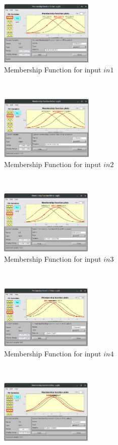 \documentclass[11pt]{article}
\begin{document}
\begin{figure}[ht]
	\centering
	\begin{subfigure}[t]{0.3\textwidth}
		\centering
		\includegraphics[height=1.2in]{images/subtractive_in1}
		\caption{Membership Function for input $in1$}
	\end{subfigure}
	~ 
	\begin{subfigure}[t]{0.3\textwidth}
		\centering
		\includegraphics[height=1.2in]{images/subtractive_in2}
		\caption{Membership Function for input $in2$}
	\end{subfigure}
	~
	\begin{subfigure}[t]{0.3\textwidth}
		\centering
		\includegraphics[height=1.2in]{images/subtractive_in3}
		\caption{Membership Function for input $in3$}
	\end{subfigure}
	\\
	\begin{subfigure}[t]{0.3\textwidth}
		\centering
		\includegraphics[height=1.2in]{images/subtractive_in4}
		\caption{Membership Function for input $in4$}
	\end{subfigure}
	~ 
	\begin{subfigure}[t]{0.3\textwidth}
		\centering
		\includegraphics[height=1.2in]{images/subtractive_in5}

\end{subfigure}
\end{figure}
\end{document}
